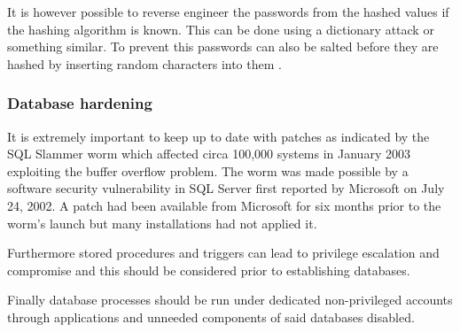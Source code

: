 \documentclass[11pt, twocolumn]{article}
\begin{document}
It is however possible to reverse engineer the passwords from the hashed values if the hashing algorithm is known.  This can be done using a dictionary attack or something similar.  To prevent this passwords can also be salted before they are hashed by inserting random characters into them \cite{salt}.

\subsubsection{Database hardening}
It is extremely important to keep up to date with patches as indicated by the SQL Slammer worm which affected circa 100,000 systems in January 2003 exploiting the buffer overflow problem.  The worm was made possible by a software security vulnerability in SQL Server first reported by Microsoft on July 24, 2002.  A patch had been available from Microsoft for six months prior to the worm's launch but many installations had not applied it.

Furthermore stored procedures and triggers can lead to privilege escalation and compromise and this should be considered prior to establishing databases.

Finally database processes should be run under dedicated non-privileged accounts through applications and unneeded components of said databases disabled.
\end{document}
